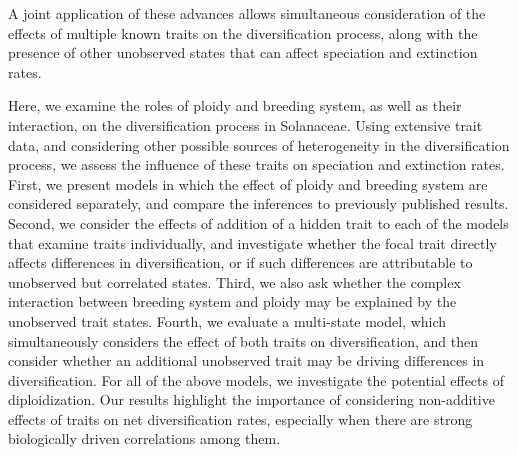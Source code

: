 A joint application of these advances allows simultaneous consideration of the effects of multiple known traits on the diversification process, along with the presence of other unobserved states that can affect speciation and extinction rates. 

Here, we examine the roles of ploidy and breeding system, as well as their interaction, on the diversification process in Solanaceae.
Using extensive trait data, and considering other possible sources of heterogeneity in the diversification process, we assess the influence of these traits on speciation and extinction rates.
First, we present models in which the effect of ploidy and breeding system are considered separately, and compare the inferences to previously published results. 
Second, we consider the effects of addition of a hidden trait to each of the models that examine traits individually, and investigate whether the focal trait directly affects differences in diversification, or if such differences are attributable to unobserved but correlated states.
Third, we also ask whether the complex interaction between breeding system and ploidy may be explained by the unobserved trait states. 
Fourth, we evaluate a multi-state model, which simultaneously considers the effect of both traits on diversification, and then consider whether an additional unobserved trait may be driving differences in diversification. 
For all of the above models, we investigate the potential effects of diploidization. 
Our results highlight the importance of considering non-additive effects of traits on net diversification rates, especially when there are strong biologically driven correlations among them.



